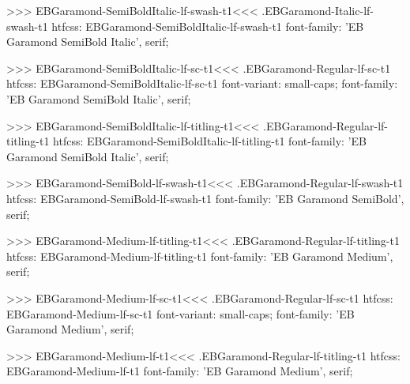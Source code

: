 {{{{{{{>>>
\<EBGaramond-SemiBoldItalic-lf-swash-t1\><<<
.EBGaramond-Italic-lf-swash-t1
htfcss:  EBGaramond-SemiBoldItalic-lf-swash-t1  font-family: 'EB Garamond SemiBold Italic', serif;

>>>
\<EBGaramond-SemiBoldItalic-lf-sc-t1\><<<
.EBGaramond-Regular-lf-sc-t1
htfcss:  EBGaramond-SemiBoldItalic-lf-sc-t1  font-variant: small-caps; font-family: 'EB Garamond SemiBold Italic', serif;

>>>
\<EBGaramond-SemiBoldItalic-lf-titling-t1\><<<
.EBGaramond-Regular-lf-titling-t1
htfcss:  EBGaramond-SemiBoldItalic-lf-titling-t1  font-family: 'EB Garamond SemiBold Italic', serif;

>>>
\<EBGaramond-SemiBold-lf-swash-t1\><<<
.EBGaramond-Regular-lf-swash-t1
htfcss:  EBGaramond-SemiBold-lf-swash-t1  font-family: 'EB Garamond SemiBold', serif;

>>>
\<EBGaramond-Medium-lf-titling-t1\><<<
.EBGaramond-Regular-lf-titling-t1
htfcss:  EBGaramond-Medium-lf-titling-t1  font-family: 'EB Garamond Medium', serif;

>>>
\<EBGaramond-Medium-lf-sc-t1\><<<
.EBGaramond-Regular-lf-sc-t1
htfcss:  EBGaramond-Medium-lf-sc-t1  font-variant: small-caps; font-family: 'EB Garamond Medium', serif;

>>>
\<EBGaramond-Medium-lf-t1\><<<
.EBGaramond-Regular-lf-titling-t1
htfcss:  EBGaramond-Medium-lf-t1  font-family: 'EB Garamond Medium', serif;

}}}}}}}
